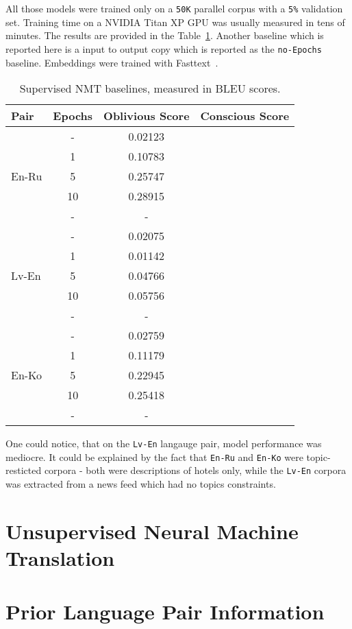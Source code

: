 \documentclass[]{article}
\begin{document}
All those models were trained only on a {\tt 50K} parallel corpus with a {\tt 5\%} validation set.
Training time on a NVIDIA Titan XP GPU was usually measured in tens of minutes.
The results are provided in the Table~\ref{table:baselines}.
Another baseline which is reported here is a input to output copy which is reported as the {\tt no-Epochs} baseline.
Embeddings were trained with Fasttext~\citep{bojanowski2016enriching}.

\begin{table}
\begin{center}
\begin{tabular}{ l c c c }
Pair & Epochs & Oblivious Score & Conscious Score \\
\hline
\multirow{5}{4em}{En-Ru} & - & 0.02123 & \\
& 1 & 0.10783 & \\
& 5 & 0.25747 & \\
& 10 & 0.28915 & \\
& - & -  & \\
\hline
\multirow{5}{4em}{Lv-En} & - & 0.02075 & \\
& 1 & 0.01142 & \\
& 5 & 0.04766 & \\
& 10 & 0.05756 & \\
& - & - & \\
\hline
\multirow{5}{4em}{En-Ko} & - & 0.02759 & \\
& 1 & 0.11179 & \\
& 5 & 0.22945 & \\
& 10 & 0.25418 & \\
& - & - &
\end{tabular}
\end{center}
\caption{Supervised NMT baselines, measured in BLEU scores.}
\label{table:baselines}
\end{table}

One could notice, that on the {\tt Lv-En} langauge pair, model performance was mediocre.
It could be explained by the fact that {\tt En-Ru} and {\tt En-Ko} were topic-resticted corpora - both were descriptions of hotels only, while the {\tt Lv-En} corpora was extracted from a news feed which had no topics constraints.

\section{Unsupervised Neural Machine Translation}
\label{sect:unmt}

\section{Prior Language Pair Information}
\label{sect:nonoblivious}
\end{document}
